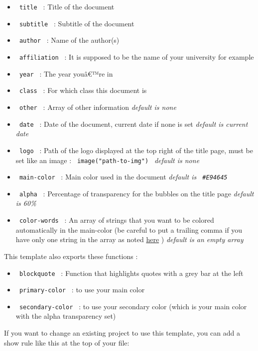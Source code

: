 \begin{itemize}
\tightlist
\item
  \texttt{\ title\ } : Title of the document
\item
  \texttt{\ subtitle\ } : Subtitle of the document
\item
  \texttt{\ author\ } : Name of the author(s)
\item
  \texttt{\ affiliation\ } : It is supposed to be the name of your
  university for example
\item
  \texttt{\ year\ } : The year youâ€™re in
\item
  \texttt{\ class\ } : For which class this document is
\item
  \texttt{\ other\ } : Array of other information \emph{default is none}
\item
  \texttt{\ date\ } : Date of the document, current date if none is set
  \emph{default is current date}
\item
  \texttt{\ logo\ } : Path of the logo displayed at the top right of the
  title page, must be set like an image :
  \texttt{\ image("path-to-img")\ } \emph{default is none}
\item
  \texttt{\ main-color\ } : Main color used in the document
  \emph{default is \texttt{\ \#E94645\ }}
\item
  \texttt{\ alpha\ } : Percentage of transparency for the bubbles on the
  title page \emph{default is 60\%}
\item
  \texttt{\ color-words\ } : An array of strings that you want to be
  colored automatically in the main-color (be careful to put a trailing
  comma if you have only one string in the array as noted
  \href{https://typst.app/docs/reference/foundations/array/}{here} )
  \emph{default is an empty array}
\end{itemize}

This template also exports these functions :

\begin{itemize}
\tightlist
\item
  \texttt{\ blockquote\ } : Function that highlights quotes with a grey
  bar at the left
\item
  \texttt{\ primary-color\ } : to use your main color
\item
  \texttt{\ secondary-color\ } : to use your secondary color (which is
  your main color with the alpha transparency set)
\end{itemize}

If you want to change an existing project to use this template, you can
add a show rule like this at the top of your file:

